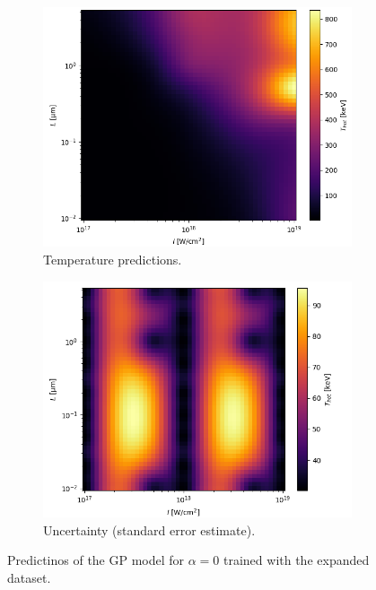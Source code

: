 \begin{figure}[ht]
	\centering
	\begin{subfigure}{0.49\textwidth}
		\centering
		\includegraphics[width=\textwidth]{figures/improved-model}
		\caption{Temperature predictions.}
		\label{fig:gp-improved-pred}
	\end{subfigure}
	\hfill
	\begin{subfigure}{0.49\textwidth}
		\centering
		\includegraphics[width=\textwidth]{figures/improved-model-ss}
		\caption{Uncertainty (standard error estimate).}
		\label{fig:gp-improved-ss}
	\end{subfigure}
	\caption{Predictinos of the GP model for $\alpha = 0$ trained with the expanded dataset.}
	\label{fig:gp-improved}
\end{figure}

